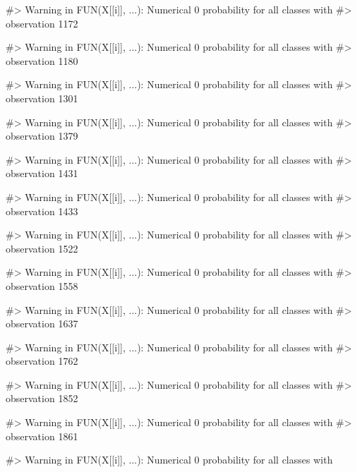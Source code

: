 \begin{Schunk}
\begin{Soutput}
#> Warning in FUN(X[[i]], ...): Numerical 0 probability for all classes with
#> observation 1172
\end{Soutput}
\begin{Soutput}
#> Warning in FUN(X[[i]], ...): Numerical 0 probability for all classes with
#> observation 1180
\end{Soutput}
\begin{Soutput}
#> Warning in FUN(X[[i]], ...): Numerical 0 probability for all classes with
#> observation 1301
\end{Soutput}
\begin{Soutput}
#> Warning in FUN(X[[i]], ...): Numerical 0 probability for all classes with
#> observation 1379
\end{Soutput}
\begin{Soutput}
#> Warning in FUN(X[[i]], ...): Numerical 0 probability for all classes with
#> observation 1431
\end{Soutput}
\begin{Soutput}
#> Warning in FUN(X[[i]], ...): Numerical 0 probability for all classes with
#> observation 1433
\end{Soutput}
\begin{Soutput}
#> Warning in FUN(X[[i]], ...): Numerical 0 probability for all classes with
#> observation 1522
\end{Soutput}
\begin{Soutput}
#> Warning in FUN(X[[i]], ...): Numerical 0 probability for all classes with
#> observation 1558
\end{Soutput}
\begin{Soutput}
#> Warning in FUN(X[[i]], ...): Numerical 0 probability for all classes with
#> observation 1637
\end{Soutput}
\begin{Soutput}
#> Warning in FUN(X[[i]], ...): Numerical 0 probability for all classes with
#> observation 1762
\end{Soutput}
\begin{Soutput}
#> Warning in FUN(X[[i]], ...): Numerical 0 probability for all classes with
#> observation 1852
\end{Soutput}
\begin{Soutput}
#> Warning in FUN(X[[i]], ...): Numerical 0 probability for all classes with
#> observation 1861
\end{Soutput}
\begin{Soutput}
#> Warning in FUN(X[[i]], ...): Numerical 0 probability for all classes with

\end{Soutput}
\end{Schunk}
